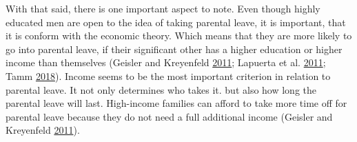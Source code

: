 \documentclass[
  12pt,
]{article}
\begin{document}
With that said, there is one important aspect to note. Even though highly educated men are open to the idea of taking parental leave, it is important, that it is conform with the economic theory. Which means that they are more likely to go into parental leave, if their significant other has a higher education or higher income than themselves (Geisler and Kreyenfeld \protect\hyperlink{ref-geisler_against_2011}{2011}; Lapuerta et al. \protect\hyperlink{ref-lapuerta_individual_2011}{2011}; Tamm \protect\hyperlink{ref-tamm_fathers_2018}{2018}).
Income seems to be the most important criterion in relation to parental leave. It not only determines who takes it. but also how long the parental leave will last. High-income families can afford to take more time off for parental leave because they do not need a full additional income (Geisler and Kreyenfeld \protect\hyperlink{ref-geisler_against_2011}{2011}).
\end{document}
